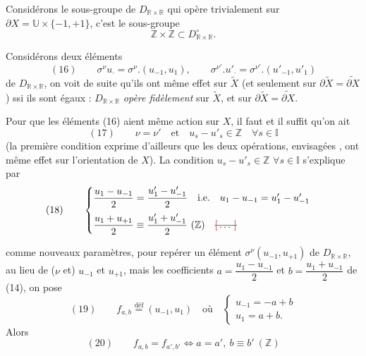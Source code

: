 \documentclass[11pt,a4paper]{article}
\begin{document}
Considérons le sous-groupe de $D_{\mathbb{R}\times\mathbb{R}}$ qui opère trivialement sur $\partial X=\mathbb{U}\times\{-1,+1\}$, c'est le sous-groupe
\[
\mathbb{Z}\times\mathbb{Z}\subset D^{\circ}_{\mathbb{R}\times\mathbb{R}}.
\]

Considérons deux éléments
\[
(16)\qquad \sigma^\nu u_{\cdot}=\sigma^\nu.(u_{-1},u_1),\qquad \sigma^{\nu'}.u'_{\cdot}=\sigma^{\nu'}.(u'_{-1},u'_1)
\]
de $D_{\mathbb{R}\times\mathbb{R}}$, on voit de suite qu'ils ont même effet sur $\widetilde{X}$ \struck{\ill{}} (et  seulement sur $\partial\widetilde{X}=\widetilde{\partial X}$) ssi ils sont égaux : $D_{\mathbb{R}\times\mathbb{R}}$ \emph{opère fidèlement} sur $\widetilde{X}$, et  sur $\partial\widetilde{X}=\widetilde{\partial X}$.

Pour que les éléments (16) aient même action sur $X$, il faut et il suffit qu'on ait
\[
(17)\qquad \nu=\nu' \quad\text{et}\quad u_s-u'_s\in\mathbb{Z}\quad \forall s\in\mathbb{I}
\]
(la première condition  exprime d'ailleurs que les deux opérations, envisagées \ill{}, ont même effet sur l'orientation de $X$). La condition $u_s-u'_s\in\mathbb{Z}$ $\forall s\in\mathbb{I}$ s'explique par
\[
(18)\qquad
\begin{cases}
\dfrac{u_1-u_{-1}}{2}=\dfrac{u'_1-u'_{-1}}{2} \quad\text{i.e.}\quad u_1-u_{-1}=u'_1-u'_{-1}\\[2ex]
\dfrac{u_1+u_{+1}}{2}\equiv\dfrac{u'_1+u'_{-1}}{2}\ (\mathbb{Z}) \quad \text{\struck{\ill{}}}
\end{cases}
\]

  comme nouveaux paramètres, pour repérer un élément $\sigma^\nu(u_{-1},u_{+1})$ de $D_{\mathbb{R}\times\mathbb{R}}$, au lieu de ($\nu$ et) $u_{-1}$ et $u_{+1}$, mais les coefficients
$a=\dfrac{u_1-u_{-1}}{2}$ et $b=\dfrac{u_1+u_{-1}}{2}$ de (14), on pose
\[
(19)\qquad f_{a,b}\overset{\text{déf}}{=}(u_{-1},u_1)\quad\text{où}\quad
\begin{cases} u_{-1}=-a+b\\ u_1=a+b.\end{cases}
\]
Alors \ill{}
\[
(20)\qquad f_{a,b}=f_{a',b'} \iff a=a',\ b\equiv b'\ (\mathbb{Z})
\]
\end{document}
